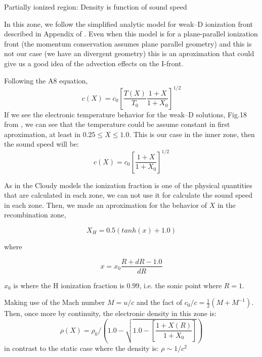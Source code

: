 \documentclass[useAMS,usenatbib]{mn2e}
\begin{document}
Partially ionized region: Density is function of sound speed

In this zone, we follow the simplified analytic model for weak--D ionization front described in Appendix of \citet{2005ApJ...621..328H}. Even when this model is for a plane-parallel ionization front (the momentum conservation assumes plane parallel geometry) and this is not our case (we have an divergent geometry) this is an aproximation that could give us a good idea of the advection effects on the I-front.

Following the A8 equation, 
\begin{equation}
  c(X) = c_0 \left [ \frac{T(X)}{T_0} \frac{1+X}{1+X_0}\right]^{1/2}
\end{equation}
If we see the electronic temperature behavior for the weak--D solutions, Fig.18 from \citet{2005ApJ...621..328H}, we can see that the temperature could be assume constant in first aproximation, at least in $0.25 \le X \le 1.0$. This is our case in the inner zone, then the sound speed will be:
\begin{equation}
  c(X) = c_0 \left [ \frac{1+X}{1+X_0}\right]^{1/2}
\end{equation}

As in the Cloudy models the ionization fraction is one of the physical quantities that are calculated in each zone, we can not use it for calculate the sound speed in each zone. Then, we made an aproximation for the behavior of $X$ in the recombination zone, 

\begin{equation}
  X_H = 0.5 (tan h (x) + 1.0)
\end{equation}

where 

\begin{equation}
  x = x_0 \frac{R + dR -1.0}{dR}
\end{equation}

$x_0$ is where the H ionization fraction is 0.99, i.e. the sonic point where $R = 1$.

Making use of the Mach number $M = u/c$ and the fact of $c_0/c = \frac{1}{2} \left ( M + M^{-1} \right)$. Then, once more by continuity, the electronic density in this zone is:
\begin{equation}
  \rho (X) = \rho_0 / \left ( 1.0 - \sqrt{ 1.0 - \left [ \frac{1+X(R)}{1+X_0} \right ]} \right )
\end{equation}
in contrast to the static case where the density is: $\rho \sim 1/c^2$
\end{document}
